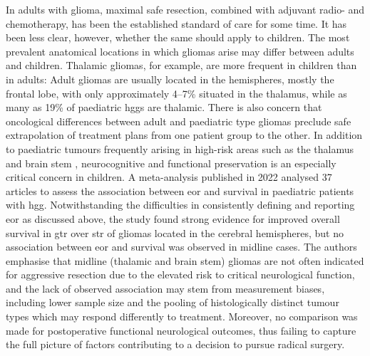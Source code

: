 In adults with glioma, maximal safe resection, combined with adjuvant radio- and chemotherapy, has been the established standard of care for some time.
It has been less clear, however, whether the same should apply to children.
The most prevalent anatomical locations in which gliomas arise may differ between adults and children\autocite{Duffau2004}.
Thalamic gliomas, for example, are more frequent in children than in adults\autocite{Cinalli2018,Palmisciano2021,GomezVecchio2021}:
Adult gliomas are usually located in the hemispheres, mostly the frontal lobe, with only approximately 4--7\%\autocite{GomezVecchio2021,Larjavaara2007} situated in the thalamus, while as many as 19\% of paediatric \glspl{hgg} are thalamic\autocite{McCrea2015}.
There is also concern that oncological differences between adult and paediatric type gliomas preclude safe extrapolation of treatment plans from one patient group to the other\autocite{Jones2012,Greuter2021}.
In addition to paediatric tumours frequently arising in high-risk areas such as the thalamus and brain stem \autocite{Ostrom2015},  neurocognitive and functional preservation is an especially critical concern in children.
A meta-analysis published in 2022 analysed 37 articles to assess the association between \gls{eor} and survival in paediatric patients with \gls{hgg}\autocite{Hatoum2022}.
Notwithstanding the difficulties in consistently defining and reporting \gls{eor} as discussed above, the study found strong evidence for improved overall survival in \gls{gtr} over \gls{str} of gliomas located in the cerebral hemispheres, but no association between \gls{eor} and survival was observed in midline cases.
The authors emphasise that midline (thalamic and brain stem) gliomas are not often indicated for aggressive resection due to the elevated risk to critical neurological function, and the lack of observed association may stem from measurement biases, including lower sample size and the pooling of histologically distinct tumour types which may respond differently to treatment.
Moreover, no comparison was made for postoperative functional neurological outcomes, thus failing to capture the full picture of factors contributing to a decision to pursue radical surgery.

